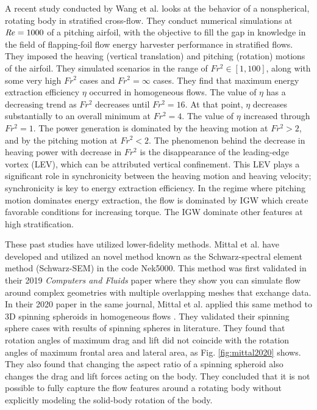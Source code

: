 A recent study conducted by Wang et al. \cite{wang_numerical_2023} looks at the behavior of a nonspherical, rotating body in stratified cross-flow. They conduct numerical simulations at $\mathit{Re} = 1000$ of a pitching airfoil, with the objective to fill the gap in knowledge in the field of flapping-foil flow energy harvester performance in stratified flows. They imposed the heaving (vertical translation) and pitching (rotation) motions of the airfoil. They simulated scenarios in the range of $Fr^2 \in [1, 100]$, along with some very high $Fr^2$ cases and $Fr^2 = \infty$ cases. They find that maximum energy extraction efficiency $\eta$ occurred in homogeneous flows. The value of $\eta$ has a decreasing trend as $Fr^2$ decreases until $Fr^2 = 16$. At that point, $\eta$ decreases substantially to an overall minimum at $Fr^2 = 4$. The value of $\eta$ increased through $Fr^2 = 1$. The power generation is dominated by the heaving motion at $Fr^2 > 2$, and by the pitching motion at $Fr^2 < 2$. The phenomenon behind the decrease in heaving power with decrease in $Fr^2$ is the disappearance of the leading-edge vortex (LEV), which can be attributed vertical confinement. This LEV plays a significant role in synchronicity between the heaving motion and heaving velocity; synchronicity is key to energy extraction efficiency. In the regime where pitching motion dominates energy extraction, the flow is dominated by IGW which create favorable conditions for increasing torque. The IGW dominate other features at high stratification. 

These past studies have utilized lower-fidelity methods. Mittal et al. have developed and utilized an novel method known as the Schwarz-spectral element method (Schwarz-SEM) in the code Nek5000. This method was first validated in their 2019 \textit{Computers and Fluids} paper \cite{mittal_nonconforming_2019} where they show you can simulate flow around complex geometries with multiple overlapping meshes that exchange data. In their 2020 paper in the same journal, Mittal et al. applied this same method to 3D spinning spheroids in homogeneous flows \cite{mittal_direct_2020}. They validated their spinning sphere cases with results of spinning spheres in literature. They found that rotation angles of maximum drag and lift did not coincide with the rotation angles of maximum frontal area and lateral area, as Fig. \ref{fig:mittal2020} shows. They also found that changing the aspect ratio of a spinning spheroid also changes the drag and lift forces acting on the body. They concluded that it is not possible to fully capture the flow features around a rotating body without explicitly modeling the solid-body rotation of the body.  

